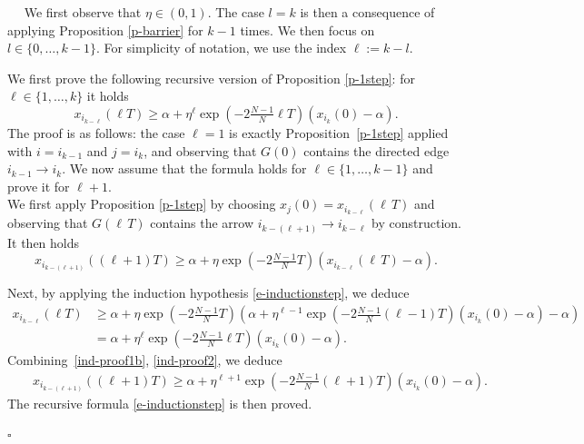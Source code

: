 \documentclass[journal]{article}
\newenvironment{proof}{{\it Proof.}~~}{\hfill$\square$}
\begin{document}
\begin{proof} We first observe that 
$\eta\in(0,1)$. The case $l=k$ is then a consequence of applying Proposition \ref{p-barrier} for $k-1$ times. We then focus on $l\in\{0,\ldots,k-1\}$. For simplicity of notation, we use the index $\ell:=k-l$. 

 We first prove the following recursive version of Proposition \ref{p-1step}: for $\ell\in\{1,\ldots, k\}$ it holds
\begin{equation}\label{e-inductionstep}x_{i_{k-\ell}}(\ell T)\geq
\alpha+\eta^\ell \exp(-2\tfrac{N-1}{N}\ell T)(x_{i_k}(0)-\alpha).
\end{equation}
The proof is as follows: the case $\ell=1$ is exactly Proposition~\ref{p-1step} applied with 
$i=i_{k-1}$ and $j=i_k$, %
and observing that $G(0)$ contains the directed edge $i_{k-1}\to i_k%
$. We now assume that the formula holds for $\ell\in\{1,\ldots,k-1\}$ and prove it for $\ell+1$. \\
We first apply Proposition \ref{p-1step} by choosing $x_j(0)=x_{i_{k-\ell}}(\ell\,T)$ and observing that $G(\ell\,T)$ contains the arrow $i_{k-(\ell+1)}\to i_{k-\ell}$ by construction. It then holds
\begin{equation}
\label{ind-proof1b}
x_{i_{k-(\ell+1)}}((\ell+1)T)\geq \alpha+\eta\exp(-2\tfrac{N-1}{N}T)(x_{i_{k-\ell}}(\ell\,T)-\alpha).
\end{equation}

Next, by applying the induction hypothesis \eqref{e-inductionstep}, we deduce
\begin{equation}
\label{ind-proof2}
\begin{aligned}
x_{i_{k-\ell}}(\ell T)&\geq \alpha+\eta\exp(-2\tfrac{N-1}{N}T)(
\alpha+\eta^{\ell-1}\exp(-2\tfrac{N-1}{N}(\ell-1)T)(x_{i_k}(0)-\alpha)
-\alpha)\\
&=\alpha+\eta^{\ell}\exp(-2\tfrac{N-1}{N}\ell T)(x_{i_k}(0)-\alpha).
\end{aligned}
\end{equation}
Combining~\eqref{ind-proof1b}, \eqref{ind-proof2}, we deduce
\begin{eqnarray*}
&&x_{i_{k-(\ell+1)}}((\ell +1)T)\geq\alpha+\eta^{\ell+1} \exp(-2\tfrac{N-1}{N}(\ell +1)T)(x_{i_k}(0)-\alpha).
\end{eqnarray*}
The recursive formula \eqref{e-inductionstep} is then proved.


\end{proof}
\end{document}
